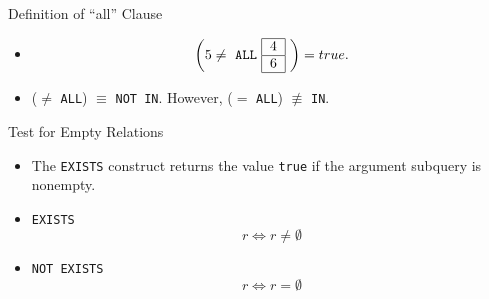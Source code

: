 \documentclass[aspectratio=169]{beamer}
\begin{document}
\begin{frame}{Definition of ``all'' Clause}
\begin{itemize}
\begin{align*}
{\begin{tabular}{|c|}
                                            5 \\
                                            \hline
                                        \end{tabular} } \right) = false \text{.}
            \end{align*}
        \item[ ]
            \vspace{-5mm}
            \begin{align*}
                \left( 5 \neq \text{ \texttt{ALL}
                                        \begin{tabular}{|c|}
                                            \hline
                                            4 \\
                                            \hline
                                            6 \\
                                            \hline
                                        \end{tabular} } \right) = true \text{.}
            \end{align*}
        \item[Note] ($\neq$ \texttt{ALL}) $\equiv$ \texttt{NOT IN}.  However, ($=$ \texttt{ALL}) $\not\equiv$ \texttt{IN}.
    \end{itemize}
\end{frame}

\begin{frame}{Test for Empty Relations}
     \begin{itemize}
        \item The \texttt{EXISTS} construct returns the value \texttt{true} if the argument subquery is nonempty.
        \item \texttt{EXISTS}
            \LARGE
            $$
                r \Leftrightarrow r \neq \emptyset
            $$
        \item \normalsize \texttt{NOT EXISTS}
            \LARGE
            $$
                r \Leftrightarrow r = \emptyset
            $$
     \end{itemize}
\end{frame}
\end{document}
